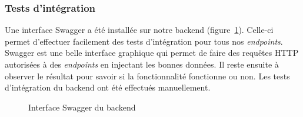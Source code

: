         \subsubsection{Tests d'intégration}
        Une interface Swagger a été installée sur notre backend (figure~\ref{fig.swagger}). Celle-ci permet d'effectuer facilement des tests d'intégration pour tous nos \emph{endpoints}. Swagger est une belle interface graphique qui permet de faire des requêtes HTTP autorisées à des \emph{endpoints} en injectant les bonnes données. Il reste ensuite à observer le résultat pour savoir si la fonctionnalité fonctionne ou non. Les tests d'intégration du backend ont été effectués manuellement.
        
        \begin{figure}[hp] \centering
            \centering
            \caption{Interface Swagger du backend}
            \label{fig.swagger}
        \end{figure}
        
                